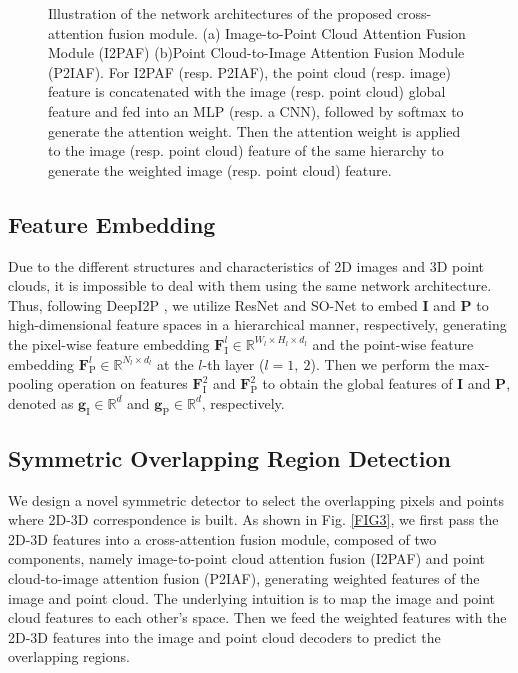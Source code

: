 \documentclass[lettersize,journal]{IEEEtran}
\begin{document}
\begin{figure*}
\centering
{}
\caption{Illustration of the network architectures of the proposed cross-attention fusion module. (a) Image-to-Point Cloud Attention Fusion Module (I2PAF) (b)Point Cloud-to-Image Attention Fusion Module (P2IAF). For I2PAF (resp. P2IAF), the point cloud (resp. image) feature is concatenated with the image (resp. point cloud) global feature and fed into an MLP (resp. a CNN), followed by softmax to generate the attention weight. Then the attention weight is applied to the image (resp. point cloud) feature of the same hierarchy to generate the weighted image (resp. point cloud) feature.} 

\label{FIG4}
\end{figure*}


\subsection{Feature Embedding}
Due to the different structures and characteristics of 2D images and 3D point clouds, it is impossible to deal with them using the same network architecture. Thus, following DeepI2P \cite{DEEPI2P}, we utilize ResNet \cite{RESNet} and SO-Net \cite{SONET} to embed $\mathbf{I}$ and $\mathbf{P}$ to high-dimensional feature spaces in a hierarchical manner, respectively, generating the pixel-wise feature embedding  $\mathbf{F}_{\text{I}}^{l}\in \mathbb{R}^{W_{l} \times H_{l} \times d_{l}}$ and the point-wise feature embedding $\mathbf{F}_{\text{P}}^{l}\in \mathbb{R}^{N_{l} \times d_{l}}$ at the $l$-th layer ($l=1,~2$). Then we perform the max-pooling operation on features $\mathbf{F}_{\text{I}}^{2}$ and $\mathbf{F}_{\text{P}}^{2}$ to obtain the global features of $\mathbf{I}$ and $\mathbf{P}$, denoted as $\mathbf{g}_{\text{I}}\in \mathbb{R}^{d}$ and $\mathbf{g}_{\text{P}}\in \mathbb{R}^{d}$, respectively.

\subsection{Symmetric Overlapping Region Detection}
We design a novel symmetric detector to select the overlapping pixels and points where 2D-3D correspondence is built. As shown in Fig. \ref{FIG3}, we first pass the 2D-3D features into a cross-attention fusion module, composed of two components, namely image-to-point cloud attention fusion (I2PAF) and point cloud-to-image attention fusion (P2IAF), generating weighted features of the image and point cloud. The underlying intuition is to map the image and point cloud features to each other's space. Then we feed the weighted features with the 2D-3D features into the image and point cloud decoders to predict the overlapping regions. 
\\
\end{document}
